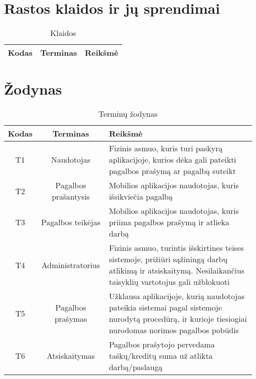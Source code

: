 \documentclass{VUMIFPSbakalaurinis}
\begin{document}
\appendix
\section{Rastos klaidos ir jų sprendimai}
\begin{table}[H]\footnotesize
	\centering
	\caption{Klaidos}
	{
	\setlength{\arrayrulewidth}{0.25mm}
	{\begin{tabular}{|c|c|m{11.5cm}|} \hline
	Kodas & Terminas & Reikšmė \\
	\hline

	\hline
	\end{tabular}}
	}
	\label{tab:table example}
\end{table}

\section{Žodynas}
\begin{table}[H]\footnotesize
	\centering
	\caption{Terminų žodynas}
	{
	\setlength{\arrayrulewidth}{0.25mm}
	{\begin{tabular}{|c|c|m{11.5cm}|} \hline
	Kodas & Terminas & Reikšmė \\
	\hline
	T1 & Naudotojas & Fizinis asmuo, kuris turi paskyrą aplikacijoje, kurios dėka gali pateikti pagalbos prašymą ar pagalbą suteikt \\
	T2 & Pagalbos prašantysis & Mobilios aplikacijos naudotojas, kuris išsikviečia pagalbą \\
	T3 & Pagalbos teikėjas & Mobilios aplikacijos naudotojas, kuris  priima pagalbos prašymą ir atlieka darbą \\
	T4 & Administratorius & Fizinis asmuo, turintis išskirtines teises sistemoje, prižiūri sąžiningą darbų atlikimą ir atsiskaitymą. Nesilaikančius taisyklių vartotojus gali užblokuoti \\
	T5 & Pagalbos prašymas & Užklausa aplikacijoje, kurią naudotojas pateikia sistemai pagal sistemoje nurodytą procedūrą, ir kurioje tiesiogiai nurodomas norimos pagalbos pobūdis \\
	T6 & Atsiskaitymas & Pagalbos prašytojo pervedama taškų/kreditų suma už atlikta darbą/paslaugą \\
	\hline
	\end{tabular}}
	}
	\label{tab:table example}
\end{table}
	
\end{document}
